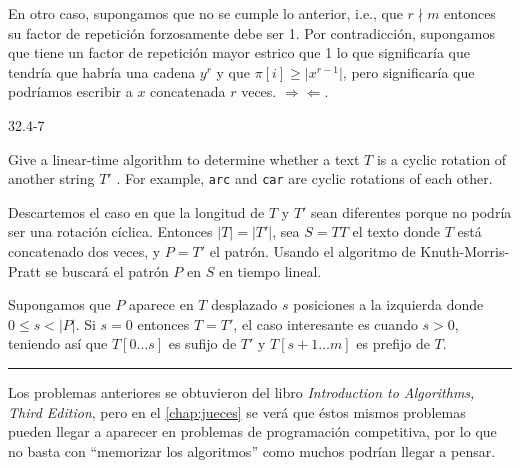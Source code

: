   En otro caso, supongamos que no se cumple lo anterior, i.e., que $r \nmid m$ entonces su factor de
  repetición forzosamente debe ser 1. Por contradicción, supongamos que tiene un factor de repetición
  mayor estrico que 1 lo que significaría que tendría que habría una cadena $y^r$ y que
  $\pi[i] \geq \vert x^{r-1} \vert$, pero significaría que podríamos escribir a $x$ concatenada $r$
  veces. $\Rightarrow\!\Leftarrow$.
  
  
  \begin{tcolorbox}
  \hypertarget{cyclic_rotation}{32.4-7}   
  Give a linear-time algorithm to determine whether a text $T$ is a cyclic rotation of another string
  $T'$ . For example, \texttt{arc} and \texttt{car} are cyclic rotations of each other.
  \end{tcolorbox}
  
  Descartemos el caso en que la longitud de $T$ y $T'$ sean diferentes porque no podría ser una
  rotación cíclica. Entonces $\vert T \vert = \vert T' \vert$, sea $S = TT$ el texto donde $T$ está
  concatenado dos veces, y $P = T'$ el patrón. Usando el algoritmo de Knuth-Morris-Pratt se buscará
  el patrón $P$ en $S$ en tiempo lineal.
  
  Supongamos que $P$ aparece en $T$ desplazado $s$ posiciones a la izquierda donde
  $0 \leq s < \vert P \vert$. Si $s = 0$ entonces $T = T'$, el caso interesante es cuando $s > 0$,
  teniendo así que $T[0 \ldots s]$ es sufijo de $T'$ y $T[s+1 \ldots m]$ es prefijo de $T$. 
  
  \noindent\rule{\textwidth}{1pt}
  
  Los problemas anteriores se obtuvieron del libro \textit{Introduction to Algorithms, Third
  Edition}\cite{cormen_2009}, pero en el \autoref{chap:jueces} se verá que éstos mismos problemas
  pueden llegar a aparecer en problemas de programación competitiva, por lo que no basta con
  ``memorizar los algoritmos'' como muchos podrían llegar a pensar.
  

